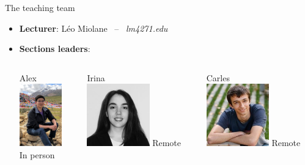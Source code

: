 \documentclass{beamer}
\begin{document}
\begin{frame}[t]{The teaching team}

	\begin{itemize}
		\item \textbf{Lecturer}: \quad Léo Miolane \  -- \ \emph{lm4271\@nyu.edu}
			\vspace{0.3cm}
			\vspace{0.3cm}
			\pause
		\item \textbf{Sections leaders}:
			\vspace{0.5cm}
			\begin{columns}
				\begin{column}{0.3\textwidth}
					\begin{center}
						Alex
						\\
						\vspace*{0.2cm}
						\includegraphics[height=2.7cm]{./alex.jpeg}
						\\
						In person
					\end{center}
				\end{column}
				\begin{column}{0.3\textwidth}
					\begin{center}
						Irina
						\\
						\vspace*{0.2cm}
						\includegraphics[height=2.7cm]{./irina.jpeg}
						Remote
					\end{center}
				\end{column}
				\begin{column}{0.3\textwidth}
					\begin{center}
						Carles
						\\
						\vspace*{0.2cm}
						\includegraphics[height=2.7cm]{./carles.jpeg}
						Remote
					\end{center}
				\end{column}
			\end{columns}
	\end{itemize}

\end{frame}
\end{document}
